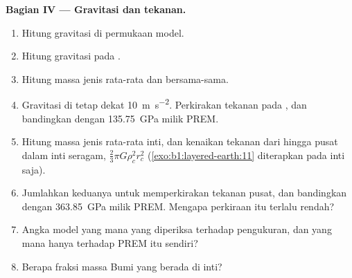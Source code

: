 \begin{problem}
\noindent\textbf{Bagian IV --- Gravitasi dan tekanan.}
\begin{enumerate}[resume]
  \item Hitung gravitasi di permukaan model.
  \item Hitung gravitasi pada .
  \item Hitung massa jenis rata-rata  dan  bersama-sama.
  \item Gravitasi di  tetap dekat \qty{10}{m.s^{-2}}. Perkirakan tekanan pada , dan bandingkan dengan \qty{135.75}{GPa} milik PREM.
  \item Hitung massa jenis rata-rata inti, dan kenaikan tekanan dari  hingga pusat dalam inti seragam, $\tfrac23\pi G\rho_c^2 r_c^2$ (\cref{exo:b1:layered-earth:11} diterapkan pada inti saja).
  \item Jumlahkan keduanya untuk memperkirakan tekanan pusat, dan bandingkan dengan \qty{363.85}{GPa} milik PREM. Mengapa perkiraan itu terlalu rendah?
  \item Angka model yang mana yang diperiksa terhadap pengukuran, dan yang mana hanya terhadap PREM itu sendiri?
  \item Berapa fraksi massa Bumi yang berada di inti?
\end{enumerate}
\end{problem}

